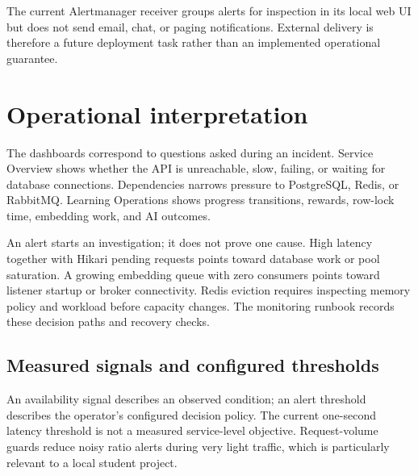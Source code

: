 \documentclass[12pt,a4paper,oneside]{report}
\begin{document}
The current Alertmanager receiver groups alerts for inspection in its local web UI but
does not send email, chat, or paging notifications. External delivery is therefore a
future deployment task rather than an implemented operational guarantee.

\section{Operational interpretation}
The dashboards correspond to questions asked during an incident. Service Overview
shows whether the API is unreachable, slow, failing, or waiting for database
connections. Dependencies narrows pressure to PostgreSQL, Redis, or RabbitMQ.
Learning Operations shows progress transitions, rewards, row-lock time, embedding
work, and AI outcomes.

An alert starts an investigation; it does not prove one cause. High latency together
with Hikari pending requests points toward database work or pool saturation. A growing
embedding queue with zero consumers points toward listener startup or broker
connectivity. Redis eviction requires inspecting memory policy and workload before
capacity changes. The monitoring runbook records these decision paths and recovery
checks.

\subsection{Measured signals and configured thresholds}
An availability signal describes an observed condition; an alert threshold describes
the operator's configured decision policy. The current one-second latency threshold
is not a measured service-level objective. Request-volume guards reduce noisy ratio
alerts during very light traffic, which is particularly relevant to a local student
project.
\end{document}
